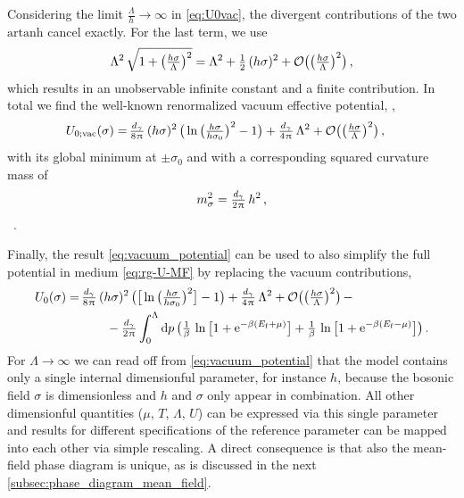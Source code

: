 Considering the limit $\tfrac{\Lambda}{h} \rightarrow \infty$ in \cref{eq:U0vac}, the divergent contributions of the two $\mathrm{artanh}$ cancel exactly. For the last term, we use
	\begin{align}
		\Lambda^2 \, \sqrt{1 + \big( \tfrac{h \sigma}{\Lambda} \big)^2} = \Lambda^2 + \tfrac{1}{2} \, ( h \sigma )^2 + \mathcal{O} \big( \big( \tfrac{h \sigma}{\Lambda} \big)^2 \big) \, ,
	\end{align}
which results in an unobservable infinite constant and a finite contribution.
In total we find the well-known renormalized vacuum \ir{} effective potential, \cf{} ,
	\begin{align}
		U_{0;\mathrm{vac}} ( \sigma ) =	\, & \tfrac{d_\gamma}{8 \mkern1.0mu\uppi\mkern1.0mu} \, ( h \sigma )^2 \, \big( \ln \big( \tfrac{h \sigma}{h \sigma_0} \big)^2 - 1 \big) + \tfrac{d_\gamma}{4 \mkern1.0mu\uppi\mkern1.0mu} \, \Lambda^2 + \mathcal{O} \big( \big( \tfrac{h \sigma}{\Lambda} \big)^2 \big) \, ,	\label{eq:vacuum_potential}
	\end{align}
with its global minimum at $\pm\sigma_0$ and with a corresponding squared curvature mass of 
	\begin{align}
		m_\sigma^2 = \tfrac{d_\gamma}{2\mkern1.0mu\uppi\mkern1.0mu} \, h^2 \, ,	\label{eq:msigma_MF}
	\end{align}
\cf{}\ . 

Finally, the result \eqref{eq:vacuum_potential} can be used to also simplify the full \ir{} potential in medium \eqref{eq:rg-U-MF} by replacing the vacuum contributions,
	\begin{align}
		U_0( \sigma ) = \, & \tfrac{d_\gamma}{8 \piu} \, ( h \sigma )^2 \, \big( \big[ \ln \big( \tfrac{h \sigma}{h \sigma_0} \big)^2 \big] - 1 \big) + \tfrac{d_\gamma}{4 \piu} \, \Lambda^2 + \order \big( \big( \tfrac{h \sigma}{\Lambda} \big)^2 \big)\, -\notag\\*%
		&\qquad- \tfrac{d_\gamma}{2 \piu} \int_{0}^{\Lambda} \dif p \, \big(\tfrac{1}{\beta} \, \ln \big[ 1 + \eu^{- \beta ( E_\mathrm{f} + \mu )} \big] + \tfrac{1}{\beta} \, \ln \big[ 1 + \eu^{- \beta ( E_\mathrm{f} - \mu )} \big] \big) \, .\label{eq:medium_potential}
	\end{align}
For $\Lambda \rightarrow \infty$ we can read off from \cref{eq:vacuum_potential} that the model contains only a single internal dimensionful parameter, for instance $h$, because the bosonic field $\sigma$ is dimensionless and $h$ and $\sigma$ only appear in combination. 
All other dimensionful quantities ($\mu$, $T$, $\Lambda$, $U$) can be expressed via this single parameter and results for different specifications of the reference parameter can be mapped into each other via simple rescaling.
A direct consequence is that also the mean-field phase diagram is unique, as is discussed in the next \cref{subsec:phase_diagram_mean_field}.


